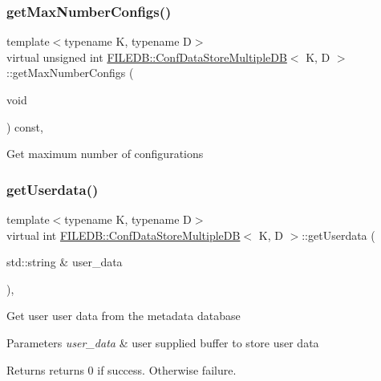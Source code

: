 \subsubsection{\texorpdfstring{getMaxNumberConfigs()}{getMaxNumberConfigs()}\hspace{0.1cm}{\footnotesize\ttfamily [3/3]}}
{\footnotesize\ttfamily template$<$typename K, typename D$>$ \\
virtual unsigned int \mbox{\hyperlink{classFILEDB_1_1ConfDataStoreMultipleDB}{F\+I\+L\+E\+D\+B\+::\+Conf\+Data\+Store\+Multiple\+DB}}$<$ K, D $>$\+::get\+Max\+Number\+Configs (\begin{DoxyParamCaption}\item[{void}]{ }\end{DoxyParamCaption}) const\hspace{0.3cm}{\ttfamily [inline]}, {\ttfamily [virtual]}}

Get maximum number of configurations \mbox{\label{classFILEDB_1_1ConfDataStoreMultipleDB_aa3f101137804c73d44e2d87538acc014}} 
\subsubsection{\texorpdfstring{getUserdata()}{getUserdata()}\hspace{0.1cm}{\footnotesize\ttfamily [1/3]}}
{\footnotesize\ttfamily template$<$typename K, typename D$>$ \\
virtual int \mbox{\hyperlink{classFILEDB_1_1ConfDataStoreMultipleDB}{F\+I\+L\+E\+D\+B\+::\+Conf\+Data\+Store\+Multiple\+DB}}$<$ K, D $>$\+::get\+Userdata (\begin{DoxyParamCaption}\item[{std\+::string \&}]{user\+\_\+data }\end{DoxyParamCaption})\hspace{0.3cm}{\ttfamily [inline]}, {\ttfamily [virtual]}}

Get user user data from the metadata database


\begin{DoxyParams}{Parameters}
{\em user\+\_\+data} & user supplied buffer to store user data \\
\hline
\end{DoxyParams}
\begin{DoxyReturn}{Returns}
returns 0 if success. Otherwise failure. 
\end{DoxyReturn}
\mbox{\label{classFILEDB_1_1ConfDataStoreMultipleDB_aa3f101137804c73d44e2d87538acc014}} 
